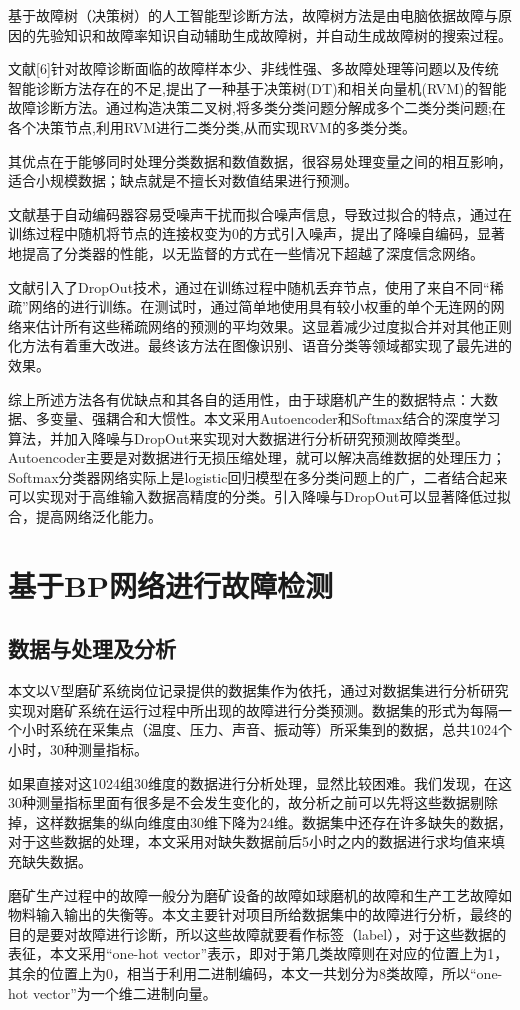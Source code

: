\documentclass{ctacn}%
\begin{document}
\begin{multicols}{2}
基于故障树（决策树）的人工智能型诊断方法，故障树方法是由电脑依据故障与原因的先验知识和故障率知识自动辅助生成故障树，并自动生成故障树的搜索过程。

文献[6]针对故障诊断面临的故障样本少、非线性强、多故障处理等问题以及传统智能诊断方法存在的不足,提出了一种基于决策树(DT)和相关向量机(RVM)的智能故障诊断方法。通过构造决策二叉树,将多类分类问题分解成多个二类分类问题;在各个决策节点,利用RVM进行二类分类,从而实现RVM的多类分类。

其优点在于能够同时处理分类数据和数值数据，很容易处理变量之间的相互影响，适合小规模数据；缺点就是不擅长对数值结果进行预测。

文献\cite{vincent2010stacked}基于自动编码器容易受噪声干扰而拟合噪声信息，导致过拟合的特点，通过在训练过程中随机将节点的连接权变为0的方式引入噪声，提出了降噪自编码，显著地提高了分类器的性能，以无监督的方式在一些情况下超越了深度信念网络。

文献\cite{srivastava2014dropout}引入了DropOut技术，通过在训练过程中随机丢弃节点，使用了来自不同“稀疏”网络的进行训练。在测试时，通过简单地使用具有较小权重的单个无连网的网络来估计所有这些稀疏网络的预测的平均效果。这显着减少过度拟合并对其他正则化方法有着重大改进。最终该方法在图像识别、语音分类等领域都实现了最先进的效果。

综上所述方法各有优缺点和其各自的适用性，由于球磨机产生的数据特点：大数据、多变量、强耦合和大惯性。本文采用Autoencoder和Softmax结合的深度学习算法，并加入降噪与DropOut来实现对大数据进行分析研究预测故障类型。Autoencoder主要是对数据进行无损压缩处理，就可以解决高维数据的处理压力；Softmax分类器网络实际上是logistic回归模型在多分类问题上的广，二者结合起来可以实现对于高维输入数据高精度的分类。引入降噪与DropOut可以显著降低过拟合，提高网络泛化能力。

\section{基于BP网络进行故障检测}

\subsection{数据与处理及分析}
本文以V型磨矿系统岗位记录提供的数据集作为依托，通过对数据集进行分析研究实现对磨矿系统在运行过程中所出现的故障进行分类预测。数据集的形式为每隔一个小时系统在采集点（温度、压力、声音、振动等）所采集到的数据，总共1024个小时，30种测量指标。

如果直接对这1024组30维度的数据进行分析处理，显然比较困难。我们发现，在这30种测量指标里面有很多是不会发生变化的，故分析之前可以先将这些数据剔除掉，这样数据集的纵向维度由30维下降为24维。数据集中还存在许多缺失的数据，对于这些数据的处理，本文采用对缺失数据前后5小时之内的数据进行求均值来填充缺失数据。

磨矿生产过程中的故障一般分为磨矿设备的故障如球磨机的故障和生产工艺故障如物料输入输出的失衡等。本文主要针对项目所给数据集中的故障进行分析，最终的目的是要对故障进行诊断，所以这些故障就要看作标签（label），对于这些数据的表征，本文采用“one-hot vector”表示，即对于第几类故障则在对应的位置上为1，其余的位置上为0，相当于利用二进制编码，本文一共划分为8类故障，所以“one-hot vector”为一个维二进制向量。


\end{multicols}
\end{document}
